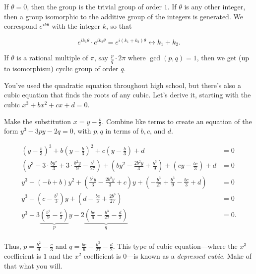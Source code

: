 \documentclass[../key.tex]{subfiles}
\begin{document}
If $\theta=0$, then the group is the trivial group of order $1$. If $\theta$ is any other integer, then a group isomorphic to the additive group of the integers is generated. We correspond $e^{ik\theta}$ with the integer $k$, so that

$$e^{ik_1\theta}\cdot e^{ik_2\theta} = e^{i(k_1+k_2)\theta} \leftrightarrow k_1+k_2.$$

If $\theta$ is a rational multiple of $\pi$, say $\frac{p}{q}\cdot 2\pi$ where $\gcd(p,q)=1$, then we get (up to isomorphism) cyclic group of order $q$.

\begin{outer_problem}
\item You've used the quadratic equation throughout high school, but there's also a cubic equation that finds the roots of any cubic. Let's derive it, starting with the cubic $x^3+bx^2+cx+d=0$.
\end{outer_problem}

\begin{inner_problem}[start=1]
\item Make the substitution $x=y-\frac{b}{3}$. Combine like terms to create an equation of the form $y^3-3py-2q=0$, with $p,q$ in terms of $b,c$, and $d$.
\end{inner_problem}

\begin{align*}
\left(y-\frac{b}{3}\right)^3+b\left(y-\frac{b}{3}\right)^2+c\left(y-\frac{b}{3}\right)+d&=0 \\
\left(y^{3}-3\cdot\frac{by^2}{3}+3\cdot\frac{b^2y}{9}-\frac{b^3}{27}\right) +\left(by^2-\frac{2b^2y}{3}+\frac{b^3}{9}\right) + \left(cy-\frac{bc}{3}\right) + d &= 0 \\
y^3 + \left(-b+b\right)y^2 + \left(\frac{b^2y}{3} - \frac{2b^2y}{3} + c\right)y + \left(-\frac{b^3}{27}+\frac{b^3}{9}-\frac{bc}{3}+d\right) &= 0 \\
y^3 + \left(c-\frac{b^2}{3}\right)y + \left(d - \frac{bc}{3} + \frac{2b^3}{27}\right) &= 0 \\
y^3 - 3\underbrace{\left(\frac{b^2}{9} - \frac{c}{3}\right)}_{p}y - 2 \underbrace{\left(\frac{bc}{6} - \frac{b^3}{27} - \frac{d}{2}\right)}_{q} &= 0. \\
\end{align*}

Thus, $p = \frac{b^2}{9} - \frac{c}{3}$ and $q=\frac{bc}{6} - \frac{b^3}{27} - \frac{d}{2}$. This type of cubic equation---where the $x^3$ coefficient is $1$  and the $x^2$ coefficient is $0$---is known as a \textit{depressed cubic}. Make of that what you will.
\end{document}

